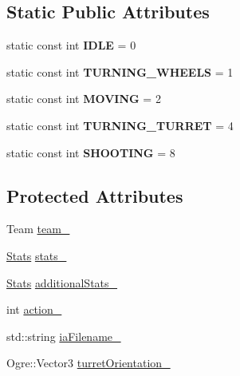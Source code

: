 \subsection*{Static Public Attributes}
\begin{DoxyCompactItemize}
\item 
static const int {\bfseries I\+D\+LE} = 0\hypertarget{class_robot_aafd6cf7303e05377bc643d67eeaec243}{}\label{class_robot_aafd6cf7303e05377bc643d67eeaec243}

\item 
static const int {\bfseries T\+U\+R\+N\+I\+N\+G\+\_\+\+W\+H\+E\+E\+LS} = 1\hypertarget{class_robot_ae38156fc21c7072e5d73ae743f66c5d4}{}\label{class_robot_ae38156fc21c7072e5d73ae743f66c5d4}

\item 
static const int {\bfseries M\+O\+V\+I\+NG} = 2\hypertarget{class_robot_ac9bccd1d10e1df73274f7cdaa5c0d60e}{}\label{class_robot_ac9bccd1d10e1df73274f7cdaa5c0d60e}

\item 
static const int {\bfseries T\+U\+R\+N\+I\+N\+G\+\_\+\+T\+U\+R\+R\+ET} = 4\hypertarget{class_robot_abcfbf98fcca5c9338227b2947faa66f9}{}\label{class_robot_abcfbf98fcca5c9338227b2947faa66f9}

\item 
static const int {\bfseries S\+H\+O\+O\+T\+I\+NG} = 8\hypertarget{class_robot_a3bf9287d863a9376b7b7778d833c9645}{}\label{class_robot_a3bf9287d863a9376b7b7778d833c9645}

\end{DoxyCompactItemize}
\subsection*{Protected Attributes}
\begin{DoxyCompactItemize}
\item 
Team \hyperlink{class_robot_a3a6eab3bff35041a41f823d8a873d69e}{team\+\_\+}
\item 
\hyperlink{class_stats}{Stats} \hyperlink{class_robot_accf825493537bfd819a7c7ac2f89fb63}{stats\+\_\+}
\item 
\hyperlink{class_stats}{Stats} \hyperlink{class_robot_a5dce20554ad211dd37a44ded1d08dd92}{additional\+Stats\+\_\+}
\item 
int \hyperlink{class_robot_afdd1731d959b952e0cdd707d4acebdd7}{action\+\_\+}
\item 
std\+::string \hyperlink{class_robot_a59d201b32aeef7a255b539aadd061e9c}{ia\+Filename\+\_\+}
\item 
Ogre\+::\+Vector3 \hyperlink{class_robot_aebf0e363388dc7d6c80964016189511a}{turret\+Orientation\+\_\+}
\end{DoxyCompactItemize}
